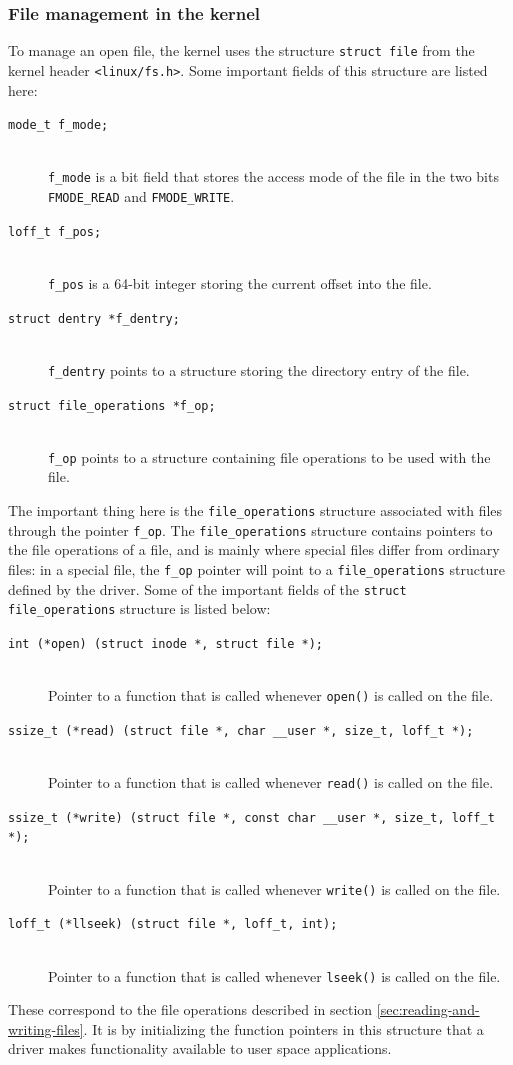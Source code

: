 \subsubsection{File management in the kernel}\label{sec:file-structure}
To manage an open file, the kernel uses the structure \texttt{struct file} from the kernel header \texttt{<linux/fs.h>}. Some important fields of this structure are listed here:
\begin{description}
  \item[\texttt{mode\_t f\_mode;}] \hfill \\
    \texttt{f\_mode} is a bit field that stores the access mode of the file in the two bits \texttt{FMODE\_READ} and \texttt{FMODE\_WRITE}.
  \item[\texttt{loff\_t f\_pos;}] \hfill \\
    \texttt{f\_pos} is a 64-bit integer storing the current offset into the file.
  \item[\texttt{struct dentry *f\_dentry;}] \hfill \\
    \texttt{f\_dentry} points to a structure storing the directory entry of the file.   
  \item[\texttt{struct file\_operations *f\_op;}] \hfill \\
    \texttt{f\_op} points to a structure containing file operations to be used with the file.
\end{description}
The important thing here is the \texttt{file\_operations} structure associated with files through the pointer \texttt{f\_op}. The \texttt{file\_operations} structure contains pointers to the file operations of a file, and is mainly where special files differ from ordinary files: in a special file, the \texttt{f\_op} pointer will point to a \texttt{file\_operations} structure defined by the driver. Some of the important fields of the \texttt{struct file\_operations} structure is listed below:
\begin{description}
  \item[\texttt{int (*open) (struct inode *, struct file *);}] \hfill \\
    Pointer to a function that is called whenever \texttt{open()} is called on the file.
  \item[\texttt{ssize\_t (*read) (struct file *, char \_\_user *, size\_t, loff\_t *);}] \hfill \\
    Pointer to a function that is called whenever \texttt{read()} is called on the file.
  \item[\texttt{ssize\_t (*write) (struct file *, const char \_\_user *, size\_t, loff\_t *);}] \hfill \\
    Pointer to a function that is called whenever \texttt{write()} is called on the file.
  \item[\texttt{loff\_t (*llseek) (struct file *, loff\_t, int);}] \hfill \\
    Pointer to a function that is called whenever \texttt{lseek()} is called on the file.
\end{description}
These correspond to the file operations described in section \ref{sec:reading-and-writing-files}. 
It is by initializing the function pointers in this structure that a driver makes functionality available to user space applications.

